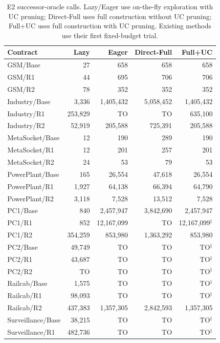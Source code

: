 \begin{table}[t]
\centering\small
\caption{E2 successor-oracle calls. Lazy/Eager use on-the-fly exploration with UC pruning; Direct-Full uses full construction without UC pruning; Full+UC uses full construction with UC pruning. Existing methods use their first fixed-budget trial.}
\label{tab:abl-e2-queries}
\begin{tabular}{lrrrr}
\toprule
Contract & Lazy & Eager & Direct-Full & Full+UC \\
\midrule
GSM/Base & 27 & 658 & 658 & 658 \\
GSM/R1 & 44 & 695 & 706 & 706 \\
GSM/R2 & 78 & 352 & 352 & 352 \\
Industry/Base & 3,336 & 1,405,432 & 5,058,452 & 1,405,432 \\
Industry/R1 & 253,829 & TO & TO & 635,100 \\
Industry/R2 & 52,919 & 205,588 & 725,391 & 205,588 \\
MetaSocket/Base & 12 & 190 & 289 & 190 \\
MetaSocket/R1 & 12 & 201 & 257 & 201 \\
MetaSocket/R2 & 24 & 53 & 79 & 53 \\
PowerPlant/Base & 165 & 26,554 & 47,618 & 26,554 \\
PowerPlant/R1 & 1,927 & 64,138 & 66,394 & 64,790 \\
PowerPlant/R2 & 3,118 & 7,528 & 13,512 & 7,528 \\
PC1/Base & 840 & 2,457,947 & 3,842,690 & 2,457,947 \\
PC1/R1 & 852 & 12,167,099 & TO & 12,167,099$^{\ddagger}$ \\
PC1/R2 & 354,259 & 853,980 & 1,363,292 & 853,980 \\
PC2/Base & 49,749 & TO & TO & TO$^{\ddagger}$ \\
PC2/R1 & 43,687 & TO & TO & TO$^{\ddagger}$ \\
PC2/R2 & TO & TO & TO & TO$^{\ddagger}$ \\
Railcab/Base & 1,575 & TO & TO & TO$^{\ddagger}$ \\
Railcab/R1 & 98,093 & TO & TO & TO$^{\ddagger}$ \\
Railcab/R2 & 437,383 & 1,357,305 & 2,842,593 & 1,357,305 \\
Surveillance/Base & 38,215 & TO & TO & TO$^{\ddagger}$ \\
Surveillance/R1 & 482,736 & TO & TO & TO$^{\ddagger}$ \\

\end{tabular}
\end{table}
